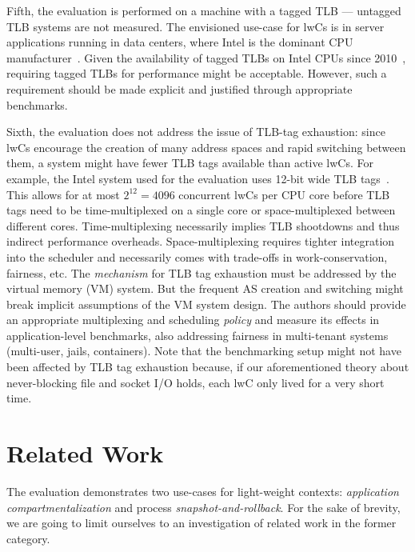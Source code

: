 \documentclass[10pt,twocolumn,a4paper]{article}
\begin{document}
Fifth, the evaluation is performed on a machine with a tagged TLB --- untagged TLB systems are not measured.
The envisioned use-case for lwCs is in server applications running in data centers, where Intel is the dominant CPU manufacturer~\cite{intelmarketshare}.
Given the availability of tagged TLBs on Intel CPUs since 2010~\cite{westmerearrives}, requiring tagged TLBs for performance might be acceptable.
However, such a requirement should be made explicit and justified through appropriate benchmarks.

Sixth, the evaluation does not address the issue of TLB-tag exhaustion:
since lwCs encourage the creation of many address spaces and rapid switching between them, a system might have fewer TLB tags available than active lwCs.
For example, the Intel system used for the evaluation uses 12-bit wide TLB tags~\cite{intelsdmpcids}.
This allows for at most $2^{12}=4096$ concurrent lwCs per CPU core before TLB tags need to be time-multiplexed on a single core or space-multiplexed between different cores.
Time-multiplexing necessarily implies TLB shootdowns and thus indirect performance overheads.
Space-multiplexing requires tighter integration into the scheduler and necessarily comes with trade-offs in work-conservation, fairness, etc.
The \textit{mechanism} for TLB tag exhaustion must be addressed by the virtual memory (VM) system.
But the frequent AS creation and switching might break implicit assumptions of the VM system design.
The authors should provide an appropriate multiplexing and scheduling \textit{policy} and measure its effects in application-level benchmarks, also addressing fairness in multi-tenant systems (multi-user, jails, containers).
Note that the benchmarking setup might not have been affected by TLB tag exhaustion because, if our aforementioned theory about never-blocking file and socket I/O holds, each lwC only lived for a very short time.


\section{Related Work}\label{rel}
The evaluation demonstrates two use-cases for light-weight contexts: \textit{application compartmentalization} and process \textit{snapshot-and-rollback}.
For the sake of brevity, we are going to limit ourselves to an investigation of related work in the former category.
\end{document}
